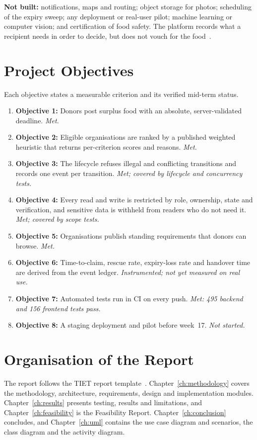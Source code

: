 \textbf{Not built:} notifications, maps and routing; object storage for photos;
scheduling of the expiry sweep; any deployment or real-user pilot; machine
learning or computer vision; and certification of food safety. The platform
records what a recipient needs in order to decide, but does not vouch for the
food~\cite{foodlinkProposal}.

\section{Project Objectives}
\label{sec:objectives}

Each objective states a measurable criterion and its verified mid-term status.
\begin{enumerate}
  \item \textbf{Objective 1:} Donors post surplus food with an absolute,
    server-validated deadline. \emph{Met.}
  \item \textbf{Objective 2:} Eligible organisations are ranked by a published
    weighted heuristic that returns per-criterion scores and reasons.
    \emph{Met.}
  \item \textbf{Objective 3:} The lifecycle refuses illegal and conflicting
    transitions and records one event per transition. \emph{Met; covered by
    lifecycle and concurrency tests.}
  \item \textbf{Objective 4:} Every read and write is restricted by role,
    ownership, state and verification, and sensitive data is withheld from
    readers who do not need it. \emph{Met; covered by scope tests.}
  \item \textbf{Objective 5:} Organisations publish standing requirements that
    donors can browse. \emph{Met.}
  \item \textbf{Objective 6:} Time-to-claim, rescue rate, expiry-loss rate and
    handover time are derived from the event ledger. \emph{Instrumented; not yet
    measured on real use.}
  \item \textbf{Objective 7:} Automated tests run in CI on every push.
    \emph{Met: 495 backend and 156 frontend tests pass.}
  \item \textbf{Objective 8:} A staging deployment and pilot before week~17.
    \emph{Not started.}
\end{enumerate}

\section{Organisation of the Report}
\label{sec:organisation}

The report follows the TIET report template~\cite{tietTemplate}.
Chapter~\ref{ch:methodology} covers the methodology, architecture, requirements,
design and implementation modules. Chapter~\ref{ch:results} presents testing,
results and limitations, and Chapter~\ref{ch:feasibility} is the Feasibility
Report. Chapter~\ref{ch:conclusion} concludes, and Chapter~\ref{ch:uml} contains
the use case diagram and scenarios, the class diagram and the activity diagram.
